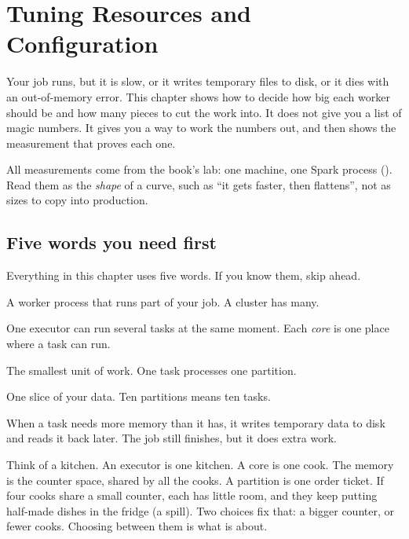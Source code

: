 \chapter{Tuning Resources and Configuration}
\label{ch:tuning}

\begin{chapterintro}
Your job runs, but it is slow, or it writes temporary files to disk, or it dies
with an out-of-memory error. This chapter shows how to decide how big each worker
should be and how many pieces to cut the work into. It does not give you a list of
magic numbers. It gives you a way to work the numbers out, and then shows the
measurement that proves each one.

All measurements come from the book's lab: one machine, one Spark process
(). Read them as the \emph{shape} of a curve, such as ``it gets
faster, then flattens'', not as sizes to copy into production.
\end{chapterintro}

\section{Five words you need first}
\label{sec:tuning-words}

Everything in this chapter uses five words. If you know them, skip ahead.

\begin{description}[leftmargin=1.2cm,style=nextline]
\item[Executor] A worker process that runs part of your job. A cluster has many.
\item[Core (or slot)] One executor can run several tasks at the same moment. Each
      \emph{core} is one place where a task can run.
\item[Task] The smallest unit of work. One task processes one partition.
\item[Partition] One slice of your data. Ten partitions means ten tasks.
\item[Spill] When a task needs more memory than it has, it writes temporary data to
      disk and reads it back later. The job still finishes, but it does extra work.
\end{description}

\begin{analogy}
Think of a kitchen. An executor is one kitchen. A core is one cook. The memory is the
counter space, shared by all the cooks. A partition is one order ticket. If four
cooks share a small counter, each has little room, and they keep putting half-made
dishes in the fridge (a spill). Two choices fix that: a bigger counter, or fewer
cooks. Choosing between them is what  is about.
\end{analogy}

